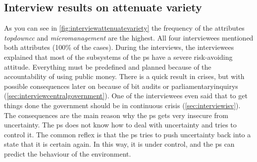 \subsection{Interview results on attenuate variety}
\label{sub:interviewresultsattenuate}
As you can see in \cref{fig:interviewattenuatevariety} the frequency of the attributes \textit{\gls{topdowncc}} and \textit{\gls{micromanagement}} are the highest. All four interviewees mentioned both \glspl{attribute} (100\% of the cases). During the interviews, the interviewees explained that most of the subsystems of the \gls{ps} have a severe risk-avoiding attitude. Everything must be predefined and planned because of the accountability of using public money. There is a quick result in crises, but with possible consequences later on because of \acrfull{bit} audits or \glspl{parliamentaryinquiry} (\cref{sec:interviewcentralgovernment}). One of the interviewees even said that to get things done the government should be in continuous crisis (\cref{sec:interviewisv}). The consequences are the main reason why the \gls{ps} gets very insecure from \gls{uncertainty}. The \gls{ps} does not know how to deal with \gls{uncertainty} and tries to control it. The common reflex is that the \gls{ps} tries to push \gls{uncertainty} back into a state that it is certain again. In this way, it is under control, and the \gls{ps} can predict the behaviour of the environment. 
